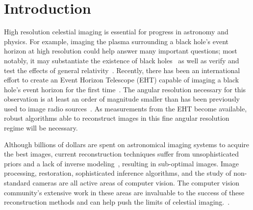 \vspace{-.2in}
\section{Introduction}
\label{section:introduction}



High resolution celestial imaging is essential for progress in astronomy and physics. 
For example, imaging the plasma surrounding a black hole's event horizon at high resolution could help answer many important questions; 
most notably, it may substantiate the existence of black holes~\cite{blackholesexist} as well as verify and test the effects of general relativity~\cite{nohairtheroem}.  
Recently, there has been an international effort to create an Event Horizon Telescope (EHT) capable of imaging a black hole's event horizon for the first time~\cite{doeleman2012jet, doeleman2008event}. The angular resolution necessary for this observation is at least an order of magnitude smaller than has been previously used to image radio sources~\cite{krichbaum2006sub}.
As measurements from the EHT become available, 
robust algorithms able to reconstruct images in this fine angular resolution regime will be necessary. 



Although billions of dollars are spent on astronomical imaging systems to acquire the best images, current reconstruction techniques suffer from unsophisticated priors and a lack of inverse modeling~\cite{renard2011image}, resulting in sub-optimal images. Image processing, restoration, sophisticated inference algorithms, and the study of non-standard cameras are all active areas of computer vision. The computer vision community's extensive work in these areas are invaluable to the success of these reconstruction methods and can help push the limits of celestial imaging.~\cite{freeman2002example, glasner2009super, levin2011efficient, zoran2011learning}. 


